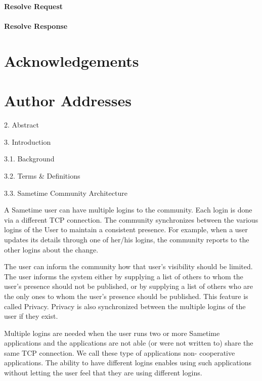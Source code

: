 \documentclass[titlepage,oneside]{book}
\begin{document}
\subsection{}
\subsubsection{Resolve Request}
\subsubsection{Resolve Response}

\chapter{Acknowledgements}
\chapter{Author Addresses}



2. Abstract


3. Introduction

3.1. Background


3.2. Terms & Definitions


3.3. Sametime Community Architecture

A Sametime user can have multiple logins to the community. Each login
is done via a different TCP connection. The community synchronizes
between the various logins of the User to maintain a consistent
presence. For example, when a user updates its details through one of
her/his logins, the community reports to the other logins about the
change.

The user can inform the community how that user's visibility should be
limited. The user informs the system either by supplying a list of
others to whom the user's presence should not be published, or by
supplying a list of others who are the only ones to whom the user's
presence should be published. This feature is called Privacy. Privacy
is also synchronized between the multiple logins of the user if they
exist.

Multiple logins are needed when the user runs two or more Sametime
applications and the applications are not able (or were not written to)
share the same TCP connection. We call these type of applications non-
cooperative applications. The ability to have different logins enables
using such applications without letting the user feel that they are
using different logins.
\end{document}
